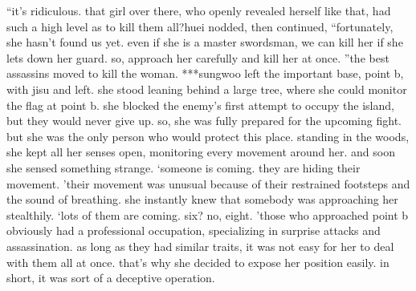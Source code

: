 “it’s ridiculous.
 that girl over there, who openly revealed herself like that, had such a high level as to kill them all?huei nodded, then continued, “fortunately, she hasn’t found us yet.
 even if she is a master swordsman, we can kill her if she lets down her guard.
 so, approach her carefully and kill her at once.
”the best assassins moved to kill the woman.
***sungwoo left the important base, point b, with jisu and left.
she stood leaning behind a large tree, where she could monitor the flag at point b.
she blocked the enemy’s first attempt to occupy the island, but they would never give up.
so, she was fully prepared for the upcoming fight.
 but she was the only person who would protect this place.
standing in the woods, she kept all her senses open, monitoring every movement around her.
and soon she sensed something strange.
‘someone is coming.
 they are hiding their movement.
’their movement was unusual because of their restrained footsteps and the sound of breathing.
 she instantly knew that somebody was approaching her stealthily.
‘lots of them are coming.
 six? no, eight.
’those who approached point b obviously had a professional occupation, specializing in surprise attacks and assassination.
 as long as they had similar traits, it was not easy for her to deal with them all at once.
that’s why she decided to expose her position easily.
 in short, it was sort of a deceptive operation.


 